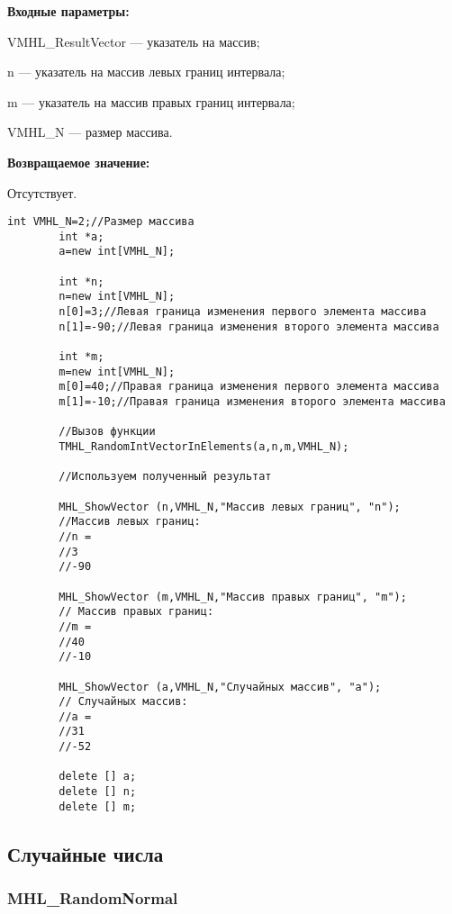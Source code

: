 \documentclass[a4paper,12pt]{article}
\begin{document}
\textbf{Входные параметры:}
 
VMHL\_ResultVector --- указатель на массив;
 
n --- указатель на массив левых границ интервала;
 
m --- указатель на массив правых границ интервала;
 
VMHL\_N --- размер массива.

\textbf{Возвращаемое значение:}

Отсутствует.


\begin{lstlisting}[label=code_use_TMHL_RandomIntVectorInElements,caption=Пример использования]
        int VMHL_N=2;//Размер массива
        int *a;
        a=new int[VMHL_N];

        int *n;
        n=new int[VMHL_N];
        n[0]=3;//Левая граница изменения первого элемента массива
        n[1]=-90;//Левая граница изменения второго элемента массива

        int *m;
        m=new int[VMHL_N];
        m[0]=40;//Правая граница изменения первого элемента массива
        m[1]=-10;//Правая граница изменения второго элемента массива

        //Вызов функции
        TMHL_RandomIntVectorInElements(a,n,m,VMHL_N);

        //Используем полученный результат

        MHL_ShowVector (n,VMHL_N,"Массив левых границ", "n");
        //Массив левых границ:
        //n =
        //3
        //-90

        MHL_ShowVector (m,VMHL_N,"Массив правых границ", "m");
        // Массив правых границ:
        //m =
        //40
        //-10

        MHL_ShowVector (a,VMHL_N,"Случайных массив", "a");
        // Случайных массив:
        //a =
        //31
        //-52

        delete [] a;
        delete [] n;
        delete [] m;
\end{lstlisting}

\subsection{Случайные числа}

\subsubsection{MHL\_RandomNormal}\label{MHL_RandomNormal}
\end{document}

